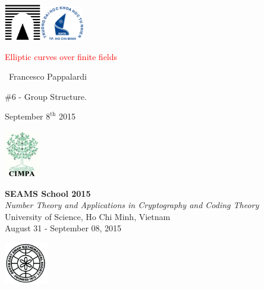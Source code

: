 \documentclass[12pt,handout]{beamer} %
\title[Elliptic curves over $\F_{q}$]{\insertlecture}
\theoremstyle{definition}
\begin{document}
\begin{frame}
\includegraphics[width=1.6cm]{images/roma3.pdf}\hfill\includegraphics[width=1.9cm]{images/HCMCUS.jpeg}
\vfill

\begin{center}\begin{sc}
\begin{Large}

\textcolor{red}{Elliptic curves over finite fields}
\end{Large}\bigskip

\ {Francesco Pappalardi}\bigskip\bigskip

\begin{large}\begin{bf}\#6 - Group Structure.
\end{bf}\end{large}\medskip

September $8^{\text{th}}$ 2015\medskip
\vfill
\end{sc}\end{center}

\includegraphics[width=1.6cm]{images/cimpalogo.pdf}\hfill
\begin{minipage}[b]{9.3cm}
\textbf{SEAMS School 2015}\\
\textit{Number Theory and Applications in Cryptography and Coding Theory}\\
University of Science, Ho Chi Minh, Vietnam\\
August 31 - September 08, 2015
\end{minipage}\hfill
\includegraphics[width=1.9cm]{images/seams.png}
\end{frame}
\end{document}

